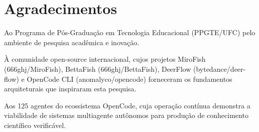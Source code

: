 \documentclass[12pt,a4paper,sumario=tradicional]{abntex2}
\begin{document}
\imprimircapa
\imprimirfolhaderosto

\newpage
\thispagestyle{empty}
\vspace*{10cm}
\begin{center}
\end{center}

\newpage
\chapter*{Agradecimentos}

Ao Programa de Pós-Graduação em Tecnologia Educacional (PPGTE/UFC) pelo ambiente de pesquisa acadêmica e inovação.

À comunidade open-source internacional, cujos projetos MiroFish (666ghj/MiroFish), BettaFish (666ghj/BettaFish), DeerFlow (bytedance/deer-flow) e OpenCode CLI (anomalyco/opencode) forneceram os fundamentos arquiteturais que inspiraram esta pesquisa.

Aos 125 agentes do ecossistema OpenCode, cuja operação contínua demonstra a viabilidade de sistemas multiagente autônomos para produção de conhecimento científico verificável.
\end{document}
